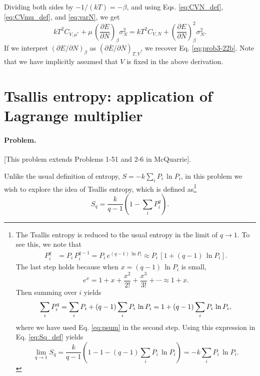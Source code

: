 \documentclass{article}
\begin{document}
%
Dividing both sides by $-1/(k T) = -\beta$,
and using Eqs. \eqref{eq:CVN_def}, \eqref{eq:CVmu_def}, and \eqref{eq:varN},
we get
$$
  k T^2 C_{V, \mu^*}
  +
  \mu \,
  \left( \frac{ \partial E } {\partial N } \right)_{\beta}
  \sigma_N^2
  =
  k T^2 C_{V, N}
  +
  \left( \frac{ \partial E } {\partial N } \right)_{\beta}^2
  \sigma_N^2
  .
$$
If we interpret
$\left( \partial E / \partial N \right)_{\beta}$
as
$\left( \partial \overline E / \partial \overline N \right)_{T, V}$,
we recover Eq. \eqref{eq:prob3-22b}.
Note that we have implicitly assumed that $V$ is fixed in the above derivation.


\section{Tsallis entropy: application of Lagrange multiplier}

\paragraph{Problem.}
[This problem extends Problems 1-51 and 2-6 in McQuarrie].

Unlike the usual definition of entropy,
$S = -k \sum_i P_i \, \ln P_i$,
in this problem we wish to explore the idea of Tsallis entropy,
which is defined as\footnote{
  The Tsallis entropy is reduced to the usual entropy in the limit of $q \to 1$.
  To see this, we note that
  \begin{align*}
  P_i^q
    &= P_i \, P_i^{q-1} = P_i \, e^{(q - 1) \, \ln P_i}
    \approx P_i \, \left[ 1 + (q - 1) \, \ln P_i \right]
    .
  \end{align*}
  The last step holds because when $x = (q-1) \, \ln P_i$ is small,
  $$
  e^x = 1 + x + \frac{x^2}{2!} + \frac{x^3}{3!} + \cdots \approx 1 + x.
  $$
  Then summing over $i$ yields
  \begin{equation}
  \sum_i P_i^q = \sum_i P_i  + (q - 1) \sum_i P_i \, \ln P_i
  = 1 + (q - 1) \sum_i P_i \, \ln P_i
    ,
    \notag %
  \end{equation}
  where we have used Eq. \eqref{eq:psum} in the second step.
  Using this expression in Eq. \eqref{eq:Sq_def} yields
  $$
  \lim_{q \to 1} S_q =
  \frac{k}{q - 1} \left( 1 - 1 - (q-1) \sum_i P_i \, \ln P_i \right)
  = -k \sum_i P_i \, \ln P_i.
  $$
}
\begin{equation}
S_q = \frac{k}{q - 1} \left( 1 - \sum_i P_i^q \right).
  \label{eq:Sq_def}
\end{equation}
\end{document}
